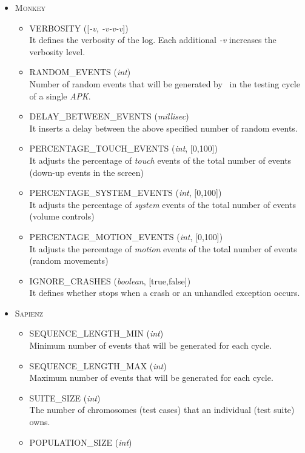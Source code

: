 \begin{itemize}
\item \textsc{Monkey}
\begin{itemize}
\item VERBOSITY ([\textit{-v, -v-v-v}]) \\
It defines the verbosity of the log. Each additional \textit{-v} increases the verbosity level. 
\item RANDOM\_EVENTS (\textit{int})\\
Number of random events that will be generated by \monkey\ in the testing cycle of a single \textit{APK}.
\item DELAY\_BETWEEN\_EVENTS (\textit{millisec})\\
It inserts a delay between the above specified number of random events. 
\item PERCENTAGE\_TOUCH\_EVENTS (\textit{int}, [0,100])\\
It adjusts the percentage of \textit{touch} events of the total number of events (\eg down-up events in the screen) 
\item PERCENTAGE\_SYSTEM\_EVENTS (\textit{int}, [0,100])\\
It adjusts the percentage of \textit{system} events of the total number of events (\eg volume controls) 
\item PERCENTAGE\_MOTION\_EVENTS (\textit{int}, [0,100])\\
It adjusts the percentage of \textit{motion} events of the total number of events (\eg random movements) 
\item IGNORE\_CRASHES (\textit{boolean}, [true,false])\\
It defines whether \monkey stops when a crash or an unhandled exception occurs. 
\end{itemize}
\item \textsc{Sapienz}
\begin{itemize}
\item SEQUENCE\_LENGTH\_MIN (\textit{int})\\
Minimum number of events that will be generated for each \sapienz cycle. 
\item SEQUENCE\_LENGTH\_MAX (\textit{int})\\
Maximum number of events that will be generated for each \sapienz cycle. 
\item SUITE\_SIZE (\textit{int})\\
The number of chromosomes (\ie test cases) that an individual (\ie test suite) owns. 
\item POPULATION\_SIZE (\textit{int})\\

\end{itemize}
\end{itemize}
